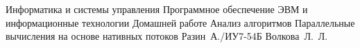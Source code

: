 \documentclass{bmstu}[a4paper]
\begin{document}
	
	\makereporttitle
	{Информатика и системы управления} %
	{Программное обеспечение ЭВМ и информационные технологии} %
	{Домашней работе} %
	{Анализ алгоритмов} %
	{Параллельные вычисления на основе нативных потоков} %
	{} %
	{Разин~А./ИУ7-54Б} %
	{Волкова~Л.~Л.} %
	
	\maketableofcontents
	
	
	

	
	
	\makebibliography
	
	
	
	
\end{document}
